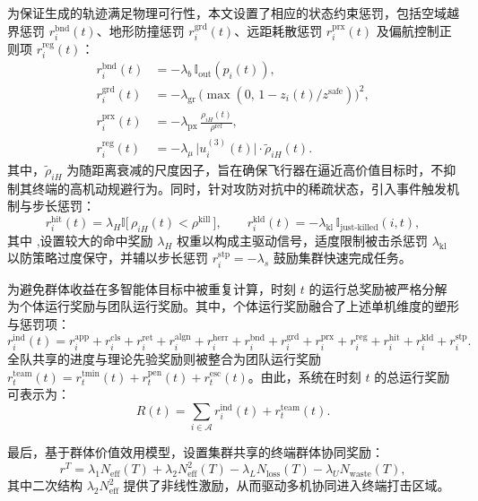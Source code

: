 为保证生成的轨迹满足物理可行性，本文设置了相应的状态约束惩罚，包括空域越界惩罚 $r_i^{\mathrm{bnd}}(t)$、地形防撞惩罚 $r_i^{\mathrm{grd}}(t)$、远距耗散惩罚 $r_i^{\mathrm{prx}}(t)$ 及偏航控制正则项 $r_i^{\mathrm{reg}}(t)$：
\begin{align}
r_i^{\mathrm{bnd}}(t)&=-\lambda_b\,\mathbb{I}_{\mathrm{out}}(p_i(t)),
\label{eq:r-bnd}\\
r_i^{\mathrm{grd}}(t)&=-\lambda_{\mathrm{gr}}\,\bigl(\max(0,\,1-z_i(t)/z^{\mathrm{safe}})\bigr)^{2},
\label{eq:r-grd}\\
r_i^{\mathrm{prx}}(t)&=-\lambda_{\mathrm{px}}\,\frac{\rho_{iH}(t)}{\rho^{\mathrm{ref}}},
\label{eq:r-prx}\\
r_i^{\mathrm{reg}}(t)&=-\lambda_{\mu}\,\bigl|u_i^{(3)}(t)\bigr|\cdot \tilde\rho_{iH}(t).
\label{eq:r-reg}
\end{align}
其中，$\tilde\rho_{iH}$ 为随距离衰减的尺度因子，旨在确保飞行器在逼近高价值目标时，不抑制其终端的高机动规避行为。同时，针对攻防对抗中的稀疏状态，引入事件触发机制与步长惩罚：
\begin{equation}
r_i^{\mathrm{hit}}(t)=\lambda_H\mathbb{I}\bigl[\,\rho_{iH}(t)<\rho^{\mathrm{kill}}\,\bigr],\qquad
r_i^{\mathrm{kld}}(t)=-\lambda_{\mathrm{kl}}\,\mathbb{I}_{\text{just-killed}}(i,t),
\label{eq:r-event}
\end{equation}
其中 ,设置较大的命中奖励 $\lambda_H$ 权重以构成主驱动信号，适度限制被击杀惩罚 $\lambda_{\mathrm{kl}}$ 以防策略过度保守，并辅以步长惩罚 $r_i^{\mathrm{stp}}=-\lambda_s$ 鼓励集群快速完成任务。

为避免群体收益在多智能体目标中被重复计算，时刻 $t$ 的运行总奖励被严格分解为个体运行奖励与团队运行奖励。其中，个体运行奖励融合了上述单机维度的塑形与惩罚项：
\begin{equation}
r_i^{\mathrm{ind}}(t)=
{r_i^{\mathrm{app}}+r_i^{\mathrm{cls}}+r_i^{\mathrm{ret}}}
+{r_i^{\mathrm{algn}}+r_i^{\mathrm{herr}}}
+{r_i^{\mathrm{bnd}}+r_i^{\mathrm{grd}}+r_i^{\mathrm{prx}}+r_i^{\mathrm{reg}}}
+r_i^{\mathrm{hit}}+r_i^{\mathrm{kld}}+r_i^{\mathrm{stp}}.
\label{eq:r-ind}
\end{equation}
全队共享的进度与理论先验奖励则被整合为团队运行奖励 $r_t^{\mathrm{team}}(t)=r_t^{\mathrm{tmin}}(t)+r_t^{\mathrm{pen}}(t)+r_t^{\mathrm{esc}}(t)$。由此，系统在时刻 $t$ 的总运行奖励可表示为：
\begin{equation}
R(t)=\sum_{i\in\mathcal{A}}r_i^{\mathrm{ind}}(t)+r_t^{\mathrm{team}}(t).
\label{eq:r-total}
\end{equation}

最后，基于群体价值效用模型，设置集群共享的终端群体协同奖励：
\begin{equation}
r^{T}=\lambda_1 N_{\mathrm{eff}}(T)+\lambda_2 N_{\mathrm{eff}}^{2}(T)
-\lambda_L N_{\mathrm{loss}}(T)-\lambda_U N_{\mathrm{waste}}(T),
\label{eq:r-term}
\end{equation}
其中二次结构 $\lambda_2 N_{\mathrm{eff}}^{2}$ 提供了非线性激励，从而驱动多机协同进入终端打击区域。



